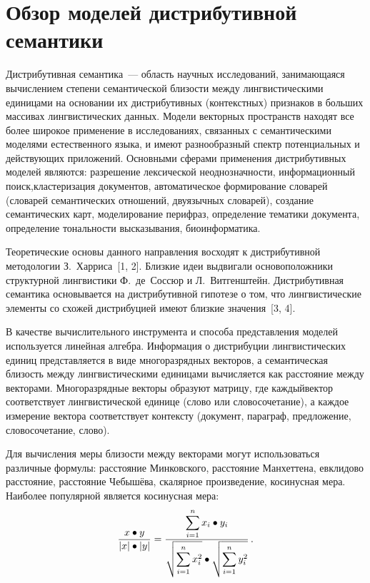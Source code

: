       \begin{multicols}{2}

            \label{st\stat}

\section{Обзор моделей дистрибутивной семантики}

Дистрибутивная семантика~--- об\-ласть научных исследований, 
занимающаяся вычислением степени семантической близости между 
лингвистическими единицами на основании их дистрибутивных 
(контекстных) признаков в больших массивах лингвистических данных. 
Модели векторных пространств находят все более широкое применение в 
исследованиях, связанных с семантическими моделями естественного 
языка, и имеют разнообразный спектр потенциальных и действующих 
приложений. Основными сферами применения дистрибутивных моделей 
являются: разрешение лексической неоднозначности, информационный 
поиск,\linebreak кластеризация документов, автоматическое формирование словарей 
(словарей семантических отноше\-ний, двуязычных словарей), создание 
семантических карт, моделирование перифраз, определение тематики 
документа, определение тональности высказывания, биоинформатика. 

Теоретические основы данного направления восходят к дистрибутивной 
методологии З.~Харриса~[1, 2]. Близкие идеи выдвигали 
основоположники структурной лингвистики Ф.~де~Сос\-сюр и 
Л.~Витгенштейн. Дистрибутивная семантика основывается на 
дистрибутивной гипотезе о том, что лингвистические элементы со схожей 
дистрибуцией имеют близкие значения~[3, 4]. 

В качестве вычислительного инструмента и спосо\-ба представления 
моделей используется линейная алгебра. Информация о дистрибуции 
лингви\-сти\-че\-ских единиц представляется в виде многоразрядных векторов, 
а семантическая близость между лингви\-сти\-че\-ски\-ми единицами 
вы\-чис\-ля\-ет\-ся как расстояние между векторами. Много\-разрядные векторы 
образуют матрицу, где каждый\linebreak вектор соответствует лингвистической 
единице (слово или словосочетание), а каждое измерение вектора 
соответствует контексту (документ, параграф, предложение, 
словосочетание, слово).

Для вычисления меры близости между векторами могут использоваться 
различные формулы: расстояние Минковского, расстояние Манхеттена, 
евклидово расстояние, расстояние Чебышёва, скалярное произведение, 
косинусная мера. Наиболее популярной является косинусная мера:
$$
\displaystyle\frac{\displaystyle x\bullet y\mathstrut}{\displaystyle \vert x\vert\bullet\vert y\vert \mathstrut}= \displaystyle\frac{\displaystyle \sum\limits_{i=1}^n 
x_i\bullet y_i\mathstrut}{\displaystyle \sqrt{\sum\limits_{i=1}^n 
x_i^2}\bullet\sqrt{\sum\limits_{i=1}^n y_i^2}\mathstrut}\,.
$$


\end{multicols}
